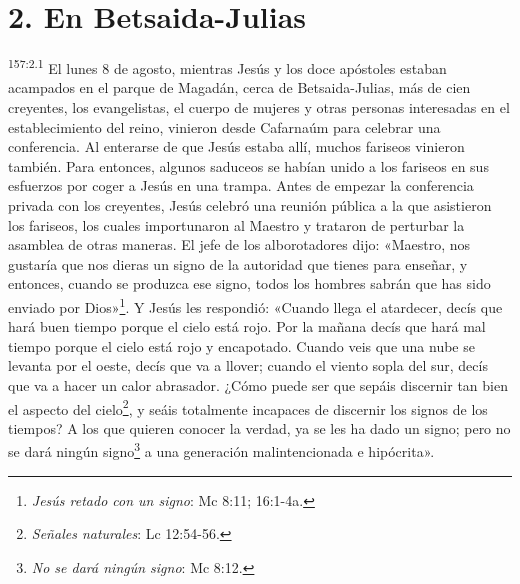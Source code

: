 \section*{2. En Betsaida-Julias}
\par 
\textsuperscript{157:2.1} El lunes 8 de agosto, mientras Jesús y los doce apóstoles estaban acampados en el parque de Magadán, cerca de Betsaida-Julias, más de cien creyentes, los evangelistas, el cuerpo de mujeres y otras personas interesadas en el establecimiento del reino, vinieron desde Cafarnaúm para celebrar una conferencia. Al enterarse de que Jesús estaba allí, muchos fariseos vinieron también. Para entonces, algunos saduceos se habían unido a los fariseos en sus esfuerzos por coger a Jesús en una trampa. Antes de empezar la conferencia privada con los creyentes, Jesús celebró una reunión pública a la que asistieron los fariseos, los cuales importunaron al Maestro y trataron de perturbar la asamblea de otras maneras. El jefe de los alborotadores dijo: «Maestro, nos gustaría que nos dieras un signo de la autoridad que tienes para enseñar, y entonces, cuando se produzca ese signo, todos los hombres sabrán que has sido enviado por Dios»\footnote{\textit{Jesús retado con un signo}: Mc 8:11; 16:1-4a.}. Y Jesús les respondió: «Cuando llega el atardecer, decís que hará buen tiempo porque el cielo está rojo. Por la mañana decís que hará mal tiempo porque el cielo está rojo y encapotado. Cuando veis que una nube se levanta por el oeste, decís que va a llover; cuando el viento sopla del sur, decís que va a hacer un calor abrasador. ¿Cómo puede ser que sepáis discernir tan bien el aspecto del cielo\footnote{\textit{Señales naturales}: Lc 12:54-56.}, y seáis totalmente incapaces de discernir los signos de los tiempos? A los que quieren conocer la verdad, ya se les ha dado un signo; pero no se dará ningún signo\footnote{\textit{No se dará ningún signo}: Mc 8:12.} a una generación malintencionada e hipócrita».

